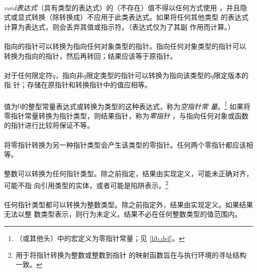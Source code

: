 
\paragraph{}
\textit{void表达式}（具有类型的表达式）的（不存在）值不得以任何方式使用
，并且隐式或显式转换（除转换成）不应用于此类表达式。如果将任何其他类型
的表达式计算为表达式，则会丢弃其值或指示符。（表达式仅为了其副
作用而计算。）

\paragraph{}
指向的指针可以转换为指向任何对象类型的指针。指向任何对象类型的指针可以
转换为指向的指针，然后再转回；结果应该等于原指针。

\paragraph{}
对于任何限定符$q$，指向非$q$限定类型的指针可以转换为指向该类型的$q$限定版本的指
针；存储在原指针和转换指针中的值应相等。

\paragraph{}
值为$0$的整型常量表达式或转换为类型的这种表达式，称为\textit{空指针常
量}。\footnote{（或其他头）中的宏定义为零指针常量；见
\ref{lib.def}。} 如果将零指针常量转换为指针类型，则结果指针，称为\textit{零指针}
，与指向任何对象或函数的指针进行比较将保证不等。

\paragraph{}
将零指针转换为另一种指针类型会产生该类型的零指针。任何两个零指针都应该相等。

\paragraph{}
整数可以转换为任何指针类型。除之前指定，结果由实现定义，可能未正确对齐，可能不指
向引用类型的实体，或者可能是陷阱表示。\footnote{用于将指针转换为整数或整数到指针
的映射函数旨在与执行环境的寻址结构一致。}

\paragraph{}
任何指针类型都可以转换为整数类型。除之前指定外，结果由实现定义。如果结果无法以整
数类型表示，则行为未定义。结果不必在任何整数类型的值范围内。

